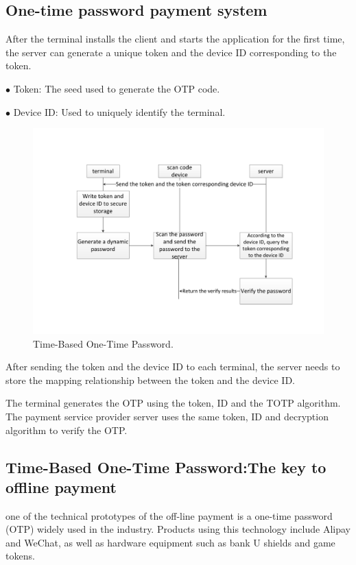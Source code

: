 \documentclass[journal]{IEEEtran}
\begin{document}
\subsection{One-time password payment system}



After the terminal installs the client and starts the application for the first time, the server can generate a unique token and the device ID corresponding to the token.

$\bullet$ Token: The seed used to generate the OTP code. 

$\bullet$ Device ID: Used to uniquely identify the terminal.

\begin{figure}[htbp]
\centerline{\includegraphics[scale=0.4]{TOTP2.pdf}}
\caption{Time-Based One-Time Password.}
\label{fig}
\end{figure}

After sending the token and the device ID to each terminal, the server needs to store the mapping relationship between the token and the device ID.

The terminal generates the OTP using the token, ID and the TOTP algorithm. The payment service provider server uses the same token, ID and decryption algorithm to verify the OTP.

\subsection{Time-Based One-Time Password:The key to offline payment}
one of the technical prototypes of the off-line payment is a one-time password (OTP) widely used in the industry. Products using this technology include Alipay and WeChat, as well as hardware equipment such as bank U shields and game tokens.
\end{document}
